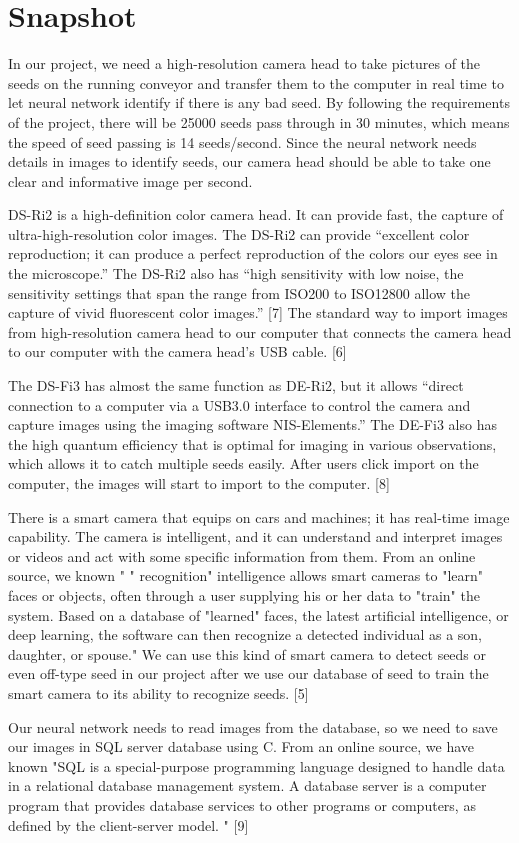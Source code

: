\documentclass[onecolumn, draftclsnofoot,10pt, compsoc]{IEEEtran}
\begin{document}
\section{Snapshot}
\par
In our project, we need a high-resolution camera head to take pictures of the seeds on the running conveyor and transfer them to the computer in real time to let neural network identify if there is any bad seed. By following the requirements of the project, there will be 25000 seeds pass through in 30 minutes, which means the speed of seed passing is 14 seeds/second. Since the neural network needs details in images to identify seeds, our camera head should be able to take one clear and informative image per second.
\par
DS-Ri2 is a high-definition color camera head.  It can provide fast, the capture of ultra-high-resolution color images. The DS-Ri2 can provide “excellent color reproduction; it can produce a perfect reproduction of the colors our eyes see in the microscope.” The DS-Ri2 also has “high sensitivity with low noise, the sensitivity settings that span the range from ISO200 to ISO12800 allow the capture of vivid fluorescent color images.” [7] The standard way to import images from high-resolution camera head to our computer that connects the camera head to our computer with the camera head's USB cable. [6]
\par
The DS-Fi3 has almost the same function as DE-Ri2, but it allows “direct connection to a computer via a USB3.0 interface to control the camera and capture images using the imaging software NIS-Elements.” The DE-Fi3 also has the high quantum efficiency that is optimal for imaging in various observations, which allows it to catch multiple seeds easily. After users click import on the computer, the images will start to import to the computer. [8]
\par
There is a smart camera that equips on cars and machines; it has real-time image capability. The camera is intelligent, and it can understand and interpret images or videos and act with some specific information from them. From an online source, we known " " recognition" intelligence allows smart cameras to "learn" faces or objects, often through a user supplying his or her data to "train" the system. Based on a database of "learned" faces, the latest artificial intelligence, or deep learning, the software can then recognize a detected individual as a son, daughter, or spouse." We can use this kind of smart camera to detect seeds or even off-type seed in our project after we use our database of seed to train the smart camera to its ability to recognize seeds. [5]
\par
Our neural network needs to read images from the database, so we need to save our images in SQL server database using C. From an online source, we have known "SQL is a special-purpose programming language designed to handle data in a relational database management system. A database server is a computer program that provides database services to other programs or computers, as defined by the client-server model. " [9]
\pagebreak
\end{document}
